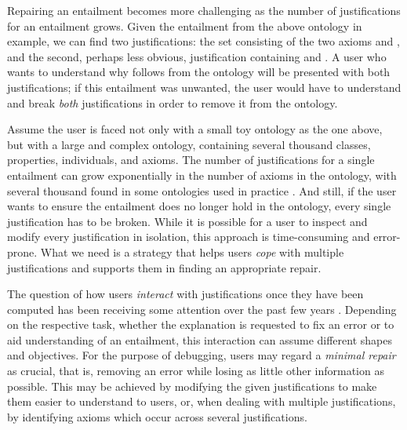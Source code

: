 Repairing an entailment becomes more challenging as the number of justifications for an entailment grows. Given the entailment  from the above ontology in example, we can find two justifications: the set consisting of the two axioms  and , and the second, perhaps less obvious, justification containing  and . A user who wants to understand why  follows from the ontology will be presented with both justifications; if this entailment was unwanted, the user would have to understand and break \emph{both} justifications in order to remove it from the ontology. 

Assume the user is faced not only with a small toy ontology as the one above, but with a large and complex ontology, containing several thousand classes, properties, individuals, and axioms. The number of justifications for a single entailment can grow exponentially in the number of axioms in the ontology, with several thousand found in some ontologies used in practice \cite{bail11jm}. And still, if the user wants to ensure the entailment does no longer hold in the ontology, every single justification has to be broken. While it is possible for a user to inspect and modify every justification in isolation, this approach is time-consuming and error-prone. What we need is a strategy that helps users \emph{cope} with multiple justifications and supports them in finding an appropriate repair.

The question of how users \emph{interact} with justifications once they have been computed has been receiving some attention over the past few years \cite{kalyanpur06fj,lam06tk,horridge10gs,horridge11gj}. Depending on the respective task, whether the explanation is requested to fix an error or to aid understanding of an entailment, this interaction can assume different shapes and objectives. For the purpose of debugging, users may regard a \emph{minimal repair} as crucial, that is, removing an error while losing as little other information as possible. This may be achieved by modifying the given justifications to make them easier to understand to users, or, when dealing with multiple justifications, by identifying axioms which occur across several justifications.


